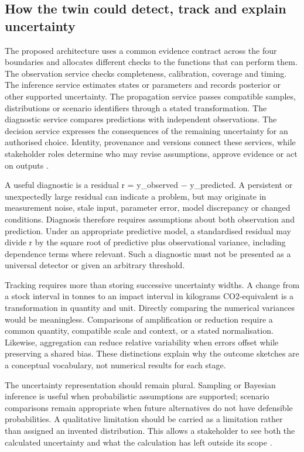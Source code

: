 \subsection{How the twin could detect, track and explain uncertainty}
The proposed architecture uses a common evidence contract across the four boundaries and allocates different checks to the functions that can perform them. The observation service checks completeness, calibration, coverage and timing. The inference service estimates states or parameters and records posterior or other supported uncertainty. The propagation service passes compatible samples, distributions or scenario identifiers through a stated transformation. The diagnostic service compares predictions with independent observations. The decision service expresses the consequences of the remaining uncertainty for an authorised choice. Identity, provenance and versions connect these services, while stakeholder roles determine who may revise assumptions, approve evidence or act on outputs \citep{R2,R6,R15}.

A useful diagnostic is a residual r = y\_observed − y\_predicted. A persistent or unexpectedly large residual can indicate a problem, but may originate in measurement noise, stale input, parameter error, model discrepancy or changed conditions. Diagnosis therefore requires assumptions about both observation and prediction. Under an appropriate predictive model, a standardised residual may divide r by the square root of predictive plus observational variance, including dependence terms where relevant. Such a diagnostic must not be presented as a universal detector or given an arbitrary threshold.

Tracking requires more than storing successive uncertainty widths. A change from a stock interval in tonnes to an impact interval in kilograms CO2-equivalent is a transformation in quantity and unit. Directly comparing the numerical variances would be meaningless. Comparisons of amplification or reduction require a common quantity, compatible scale and context, or a stated normalisation. Likewise, aggregation can reduce relative variability when errors offset while preserving a shared bias. These distinctions explain why the outcome sketches are a conceptual vocabulary, not numerical results for each stage.

The uncertainty representation should remain plural. Sampling or Bayesian inference is useful when probabilistic assumptions are supported; scenario comparisons remain appropriate when future alternatives do not have defensible probabilities. A qualitative limitation should be carried as a limitation rather than assigned an invented distribution. This allows a stakeholder to see both the calculated uncertainty and what the calculation has left outside its scope \citep{I25,I33}.

